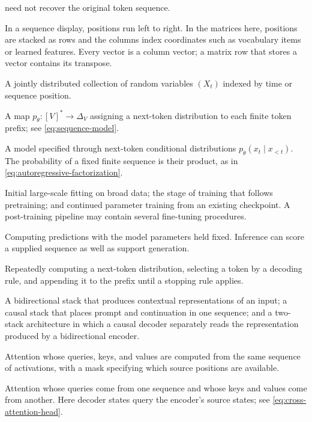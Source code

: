 \documentclass[11pt,twoside]{article}
\theoremstyle{plain}
\theoremstyle{definition}
\theoremstyle{remark}
\begin{document}
\begin{description}[style=nextline,leftmargin=1.5em,labelindent=0pt]
need not recover the original token sequence.
\item[Sequence orientation; matrix layout]
In a sequence display, positions run left to right. In the matrices here,
positions are stacked as rows and the columns index coordinates such as
vocabulary items or learned features. Every vector is a column vector; a
matrix row that stores a vector contains its transpose.
\item[Stochastic process]
A jointly distributed collection of random variables $(X_t)$ indexed by
time or sequence position.
\item[Probabilistic sequence model; stochastic sequence model]
A map $p_\theta:[V]^*\to\Delta_V$ assigning a next-token distribution to
each finite token prefix; see \cref{eq:sequence-model}.
\item[Autoregressive model]
A model specified through next-token conditional distributions
$p_\theta(x_t\mid x_{<t})$. The probability of a fixed finite sequence is
their product, as in \cref{eq:autoregressive-factorization}.
\item[Pretraining; post-training; fine-tuning]
Initial large-scale fitting on broad data; the stage of training that follows
pretraining; and continued parameter training from an existing checkpoint. A
post-training pipeline may contain several fine-tuning procedures.
\item[Inference]
Computing predictions with the model parameters held fixed. Inference can
score a supplied sequence as well as support generation.
\item[Generation]
Repeatedly computing a next-token distribution, selecting a token by a
decoding rule, and appending it to the prefix until a stopping rule applies.
\item[Encoder-only; decoder-only; encoder--decoder transformer]
A bidirectional stack that produces contextual representations of an input; a
causal stack that places prompt and continuation in one sequence; and a
two-stack architecture in which a causal decoder separately reads the
representation produced by a bidirectional encoder.
\item[Self-attention]
Attention whose queries, keys, and values are computed from the same sequence
of activations, with a mask specifying which source positions are available.
\item[Cross-attention]
Attention whose queries come from one sequence and whose keys and values
come from another. Here decoder states query the encoder's source states;
see \cref{eq:cross-attention-head}.

\end{description}
\end{document}
